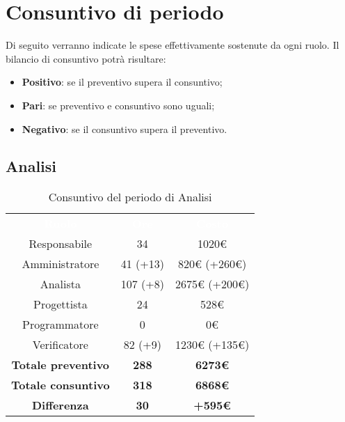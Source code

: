 \section{Consuntivo di periodo}
Di seguito verranno indicate le spese effettivamente sostenute da ogni ruolo. Il bilancio di consuntivo potrà risultare: \begin{itemize}
\item \textbf{Positivo}: se il preventivo supera il consuntivo;
\item \textbf{Pari}: se preventivo e consuntivo sono uguali;
\item \textbf{Negativo}: se il consuntivo supera il preventivo.
\end{itemize}

\subsection{Analisi}
\begin{table}[H]
\centering\renewcommand{\arraystretch}{1.5}
\caption{Consuntivo del periodo di Analisi}
\vspace{0.2cm}
\begin{tabular}{ c c c }
\rowcolor{redafk}
\textcolor{white}{\textbf{Ruolo}} & \textcolor{white}{\textbf{Ore}} & 
\textcolor{white}{\textbf{Costo}}  \\
Responsabile & 34 & 1020€ \\
Amministratore & 41 (+13) & 820€ (+260€) \\
Analista & 107 (+8) & 2675€ (+200€) \\
Progettista	& 24 & 528€  \\
Programmatore & 0 & 0€  \\
Verificatore & 82 (+9) & 1230€ (+135€)  \\
\textbf{Totale preventivo} & \textbf{288} & \textbf{6273€}  \\
\textbf{Totale consuntivo} & \textbf{318} & \textbf{6868€}  \\
\rowcolor{lastrowcolor}
\textbf{Differenza} & \textbf{30} & \textbf{+595€}  \\
\end{tabular}
\end{table}

